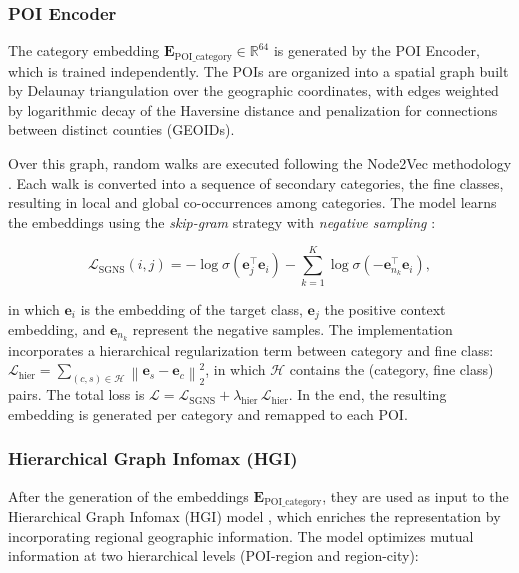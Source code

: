 \subsubsection{POI Encoder}

The category embedding $\mathbf{E}_{\text{POI\_category}} \in \mathbb{R}^{64}$ is generated by the POI Encoder, which is trained independently. The POIs are organized into a spatial graph
built by Delaunay triangulation over the geographic coordinates, with edges weighted by
logarithmic decay of the Haversine distance and penalization for connections between distinct
counties (GEOIDs).

Over this graph, random walks are executed following the Node2Vec methodology \cite{grover2016node2vec}.
Each walk is converted into a sequence of secondary categories, the fine classes, resulting in local and global co-occurrences among categories. The model learns the embeddings using the \textit{skip-gram} strategy with \textit{negative sampling} \cite{mikolov2013word2vec,mikolov2013negsampling}:

\[
\mathcal{L}_{\text{SGNS}}(i,j)
=
-\log \sigma\!\left(\mathbf{e}_j^\top \mathbf{e}_i\right)
-
\sum_{k=1}^{K}
\log \sigma\!\left(-\mathbf{e}_{n_k}^\top \mathbf{e}_i\right),
\]

in which $\mathbf{e}_i$ is the embedding of the target class, $\mathbf{e}_j$ the positive context embedding, and $\mathbf{e}_{n_k}$ represent the negative samples. The implementation incorporates a hierarchical regularization term \cite{Xu2023} between category and fine class: $\mathcal{L}_{\text{hier}} = \sum_{(c,s) \in \mathcal{H}} \left\| \mathbf{e}_s - \mathbf{e}_c \right\|_2^2$, in which $\mathcal{H}$ contains the (category, fine class) pairs. The total loss is $\mathcal{L} = \mathcal{L}_{\text{SGNS}} + \lambda_{\text{hier}} \, \mathcal{L}_{\text{hier}}$. In the end, the resulting embedding is generated per category and remapped to each POI.

\subsubsection{Hierarchical Graph Infomax (HGI)}

After the generation of the embeddings $\mathbf{E}_{\text{POI\_category}}$, they are used as input to the Hierarchical Graph Infomax (HGI) model \cite{huang2023hgi}, which enriches the representation by incorporating regional geographic information. The model optimizes mutual information at two hierarchical levels (POI-region and region-city):

